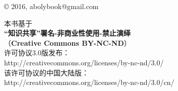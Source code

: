 \thispagestyle{empty}

\begin{center}
© 2016, abolybook@gmail.com
\medskip

本书基于\\
\textbf{“知识共享”署名-非商业性使用-禁止演绎}\\
（\textbf{Creative Commons BY-NC-ND}）\\
许可协议3.0版发布：\\
http://creativecommons.org/licenses/by-nc-nd/3.0/\\
该许可协议的中国大陆版：\\
http://creativecommons.org/licenses/by-nc-nd/3.0/cn/
\end{center}
